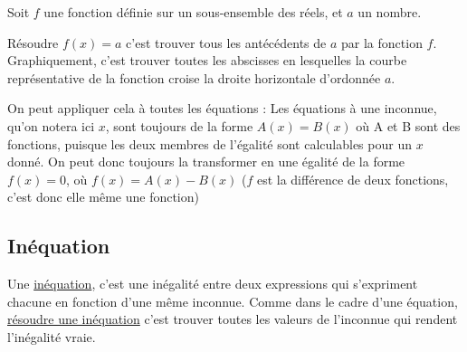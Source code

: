 \documentclass[10pt,a4paper,oneside]{book}
\begin{document}
Soit $f$ une fonction définie sur un sous-ensemble des réels, et $a$ un nombre.

\begin{minipage}{0.5\textwidth}  
Résoudre $f(x)=a$ c'est trouver tous les antécédents de $a$ par la fonction $f$.  
\newline ~ \newline
Graphiquement, c'est trouver toutes les abscisses en lesquelles la courbe représentative de la fonction croise la droite horizontale d'ordonnée $a$.
\end{minipage}
\begin{minipage}{0.35\textwidth}
\end{minipage}

On peut appliquer cela à toutes les équations : Les équations à une inconnue, qu'on notera ici $x$, sont toujours de la forme $A(x)=B(x)$ où A et B sont des fonctions, puisque les deux membres de l'égalité sont calculables pour un $x$ donné.
On peut donc toujours la transformer en une égalité de la forme $f(x)=0$, où $f(x)=A(x)-B(x)$  ($f$ est la différence de deux fonctions, c'est donc elle même une fonction)


\subsection{Inéquation}

\begin{de}
    Une \underline{inéquation}, c'est une inégalité entre deux expressions qui s'expriment chacune en fonction d'une même inconnue. Comme dans le cadre d'une équation, \underline{résoudre une inéquation} c'est trouver toutes les valeurs de l'inconnue qui rendent l'inégalité vraie.
\end{de}
\end{document}
